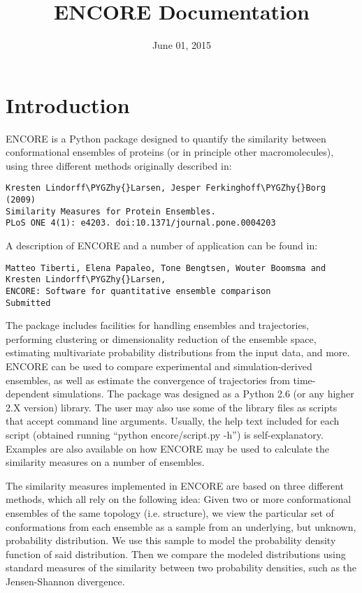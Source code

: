 \documentclass[letterpaper,10pt,english]{sphinxmanual}
\title{ENCORE Documentation}
\date{June 01, 2015}
\author{}
\def\PYGZhy{\char`\-}
\begin{document}
\maketitle
\tableofcontents
{}\label{index::doc}



\chapter{Introduction}
\label{index:introduction}\label{index:welcome-to-encore-s-documentation}
ENCORE is a Python package designed to quantify the similarity between
conformational ensembles of proteins (or in principle other
macromolecules), using three different methods originally described
in:

\begin{Verbatim}[commandchars=\\\{\}]
Kresten Lindorff\PYGZhy{}Larsen, Jesper Ferkinghoff\PYGZhy{}Borg (2009)
Similarity Measures for Protein Ensembles.
PLoS ONE 4(1): e4203. doi:10.1371/journal.pone.0004203
\end{Verbatim}

A description of ENCORE and a number of application can be found in:

\begin{Verbatim}[commandchars=\\\{\}]
Matteo Tiberti, Elena Papaleo, Tone Bengtsen, Wouter Boomsma and
Kresten Lindorff\PYGZhy{}Larsen,
ENCORE: Software for quantitative ensemble comparison
Submitted
\end{Verbatim}

The package includes facilities for handling ensembles and
trajectories, performing clustering or dimensionality reduction of the
ensemble space, estimating multivariate probability distributions from
the input data, and more. ENCORE can be used to compare experimental
and simulation-derived ensembles, as well as estimate the convergence
of trajectories from time-dependent simulations. The package was
designed as a Python 2.6 (or any higher 2.X version) library. The user
may also use some of the library files as scripts that accept command
line arguments. Usually, the help text included for each script
(obtained running “python encore/script.py -h”) is
self-explanatory. Examples are also available on how ENCORE may be
used to calculate the similarity measures on a number of ensembles.

The similarity measures implemented in ENCORE are based on three
different methods, which all rely on the following idea: Given two or
more conformational ensembles of the same topology (i.e. structure),
we view the particular set of conformations from each ensemble as a
sample from an underlying, but unknown, probability distribution. We
use this sample to model the probability density function of said
distribution. Then we compare the modeled distributions using standard
measures of the similarity between two probability densities, such as
the Jensen-Shannon divergence.
\end{document}
